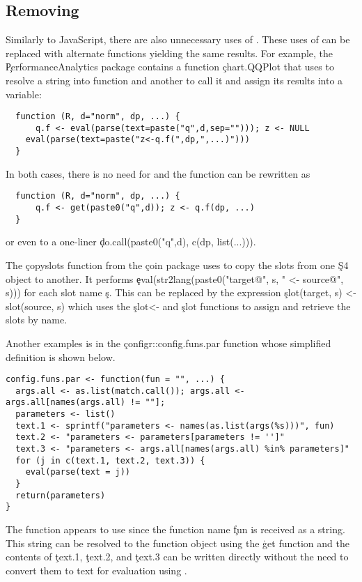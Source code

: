 \documentclass[screen,acmsmall]{acmart}
\begin{document}
\subsection{Removing \eval}

Similarly to JavaScript, there are also unnecessary uses of \eval. These uses of
\eval can be replaced with alternate functions yielding the same results. For
example, the \c{PerformanceAnalytics} package contains a function
\c{chart.QQPlot} that uses \eval to resolve a string into function and another
to call it and assign its results into a variable:
\begin{lstlisting}
  function (R, d="norm", dp, ...) {
	  q.f <- eval(parse(text=paste("q",d,sep=""))); z <- NULL
  	eval(parse(text=paste("z<-q.f(",dp,",...)")))
  }
\end{lstlisting}
  In both cases, there is no need for \eval and the function can be rewritten as
\begin{lstlisting}
  function (R, d="norm", dp, ...) {
	  q.f <- get(paste0("q",d)); z <- q.f(dp, ...)
  }
\end{lstlisting}
  or even to a one-liner \c{do.call(paste0("q",d), c(dp, list(...)))}.


  The \c{copyslots} function from the \c{coin} package uses \eval to copy the
  slots from one \c{S4} object to another. It performs
  \c{eval(str2lang(paste0("target@", s, " <- source@", s)))} for each slot name
  \c{s}. This can be replaced by the expression \c{slot(target, s) <- slot(source,
    s)} which uses the \c{slot<-} and \c{slot} functions to assign and retrieve
  the slots by name.

  Another examples is in the \c{configr::config.funs.par} function whose
  simplified definition is shown below.

\begin{lstlisting}
config.funs.par <- function(fun = "", ...) {
  args.all <- as.list(match.call()); args.all <- args.all[names(args.all) != ""];
  parameters <- list()
  text.1 <- sprintf("parameters <- names(as.list(args(%s)))", fun)
  text.2 <- "parameters <- parameters[parameters != '']"
  text.3 <- "parameters <- args.all[names(args.all) %in% parameters]"
  for (j in c(text.1, text.2, text.3)) {
    eval(parse(text = j))
  }
  return(parameters)
}
\end{lstlisting}

  The function appears to use \eval since the function name \c{fun} is received
  as a string. This string can be resolved to the function object using the
  \c{get} function and the contents of \c{text.1}, \c{text.2}, and \c{text.3}
  can be written directly without the need to convert them to text for
  evaluation using \eval.
\end{document}
